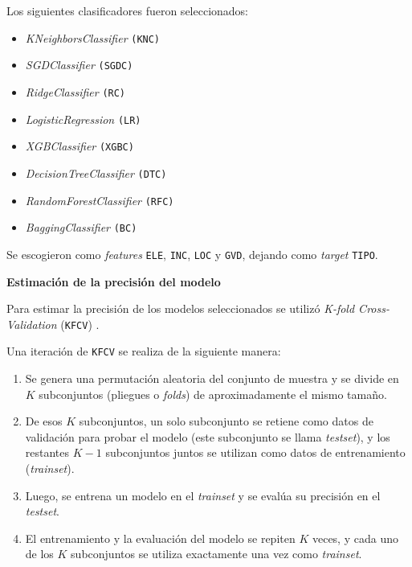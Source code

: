 \documentclass[a4paper,12pt]{article}
\begin{document}
Los siguientes clasificadores fueron seleccionados:

\begin{itemize}[noitemsep, topsep=2pt]
	\item \textit{KNeighborsClassifier} \texttt{(KNC)}
	\item \textit{SGDClassifier} \texttt{(SGDC)}
	\item \textit{RidgeClassifier} \texttt{(RC)}
    \item \textit{LogisticRegression} \texttt{(LR)}
    \item \textit{XGBClassifier} \texttt{(XGBC)}
    \item \textit{DecisionTreeClassifier} \texttt{(DTC)}
    \item \textit{RandomForestClassifier} \texttt{(RFC)}
    \item \textit{BaggingClassifier} \texttt{(BC)}
\end{itemize}

Se escogieron como \textit{features} \texttt{ELE}, \texttt{INC}, \texttt{LOC} y \texttt{GVD}, dejando como \textit{target} \texttt{TIPO}.

\hfill

\textbf{Estimación de la precisión del modelo}

Para estimar la precisión de los modelos seleccionados se utilizó \textit{K-fold Cross-Validation} (\texttt{KFCV}) \citep{kfolds}.

Una iteración de \texttt{KFCV} se realiza de la siguiente manera: 

\begin{enumerate}[noitemsep, topsep=2pt]
	\item Se genera una permutación aleatoria del conjunto de muestra y se divide en $K$ subconjuntos (pliegues o \textit{folds}) de aproximadamente el mismo tamaño.
	\item De esos $K$ subconjuntos, un solo subconjunto se retiene como datos de validación para probar el modelo (este subconjunto se llama \textit{testset}), y los restantes $K-1$ subconjuntos juntos se utilizan como datos de entrenamiento (\textit{trainset}).
	\item Luego, se entrena un modelo en el \textit{trainset} y se evalúa su precisión en el \textit{testset}. 
	\item El entrenamiento y la evaluación del modelo se repiten $K$ veces, y cada uno de los $K$ subconjuntos se utiliza exactamente una vez como \textit{trainset}.
\end{enumerate}
\end{document}
